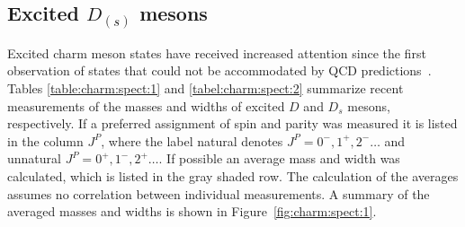 \subsection{Excited \emph{$D_{(s)}$} mesons}
Excited charm meson states have received increased attention since the first observation of states that could not be accommodated by QCD predictions~\cite{Aubert:2003fg,
Besson:2003cp,Abe:2003jk,Aubert:2003pe}. Tables \ref{table:charm:spect:1} and \ref{tabel:charm:spect:2} summarize recent measurements of the masses and widths of excited $D$ and $D_{s}$ mesons, respectively. If a preferred assignment of spin and parity was measured it is listed in the column $J^{P}$, where the label natural denotes $J^{P}=0^{-},1^{+},2^{-}\ldots$ and unnatural $J^{P}=0^{+},1^{-},2^{+}\ldots$. If possible an average mass and width was calculated, which is listed in the gray shaded row. The calculation of the averages assumes no correlation between individual measurements. A summary of the averaged masses and widths is shown in Figure~\ref{fig:charm:spect:1}. 
